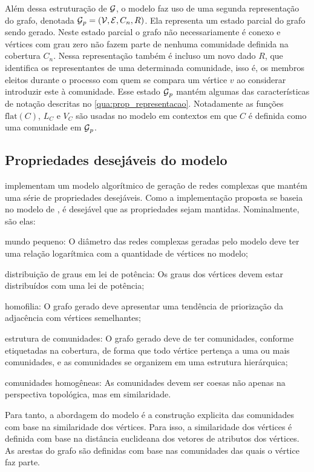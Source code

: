 \documentclass[notes.tex]{subfiles}
\begin{document}
Além dessa estruturação de $\operatorname{\mathcal{G}}$, o modelo faz uso de uma segunda representação do grafo, denotada  $\operatorname{\mathcal{G}}_p = (\operatorname{\mathcal{V}}, \operatorname{\mathcal{E}}, C_n, R)$.
Ela representa um estado parcial do grafo sendo gerado.
Neste estado parcial o grafo não necessariamente é conexo e vértices com grau zero não fazem parte de nenhuma comunidade definida na cobertura $C_n$.
Nessa representação também é incluso um novo dado $R$, que identifica os representantes de uma determinada comunidade, isso é, os membros eleitos durante o processo com quem se compara um vértice $v$ ao considerar introduzir este à comunidade.
Esse estado $\operatorname{\mathcal{G}}_p$ mantém algumas das características de notação descritas no \autoref{qua:prop_representacao}.
Notadamente as funções $\text{flat}(C)$, $L_C$ e $V_C$ são usadas no modelo em contextos em que  $C$ é definida como uma comunidade em $\operatorname{\mathcal{G}}_p$.

\subsection{Propriedades desejáveis do modelo}

 implementam um modelo algorítmico de geração de redes complexas que mantém uma série de propriedades desejáveis.
Como a implementação proposta se baseia no modelo de , é desejável que as propriedades sejam mantidas.
Nominalmente, são elas:

\begin{alineas}
    \item mundo pequeno: O diâmetro das redes complexas geradas pelo modelo deve ter uma relação logarítmica com a quantidade de vértices no modelo;
    \item distribuição de graus em lei de potência: Os graus dos vértices devem estar distribuídos com uma lei de potência;
    \item homofilia: O grafo gerado deve apresentar uma tendência de priorização da adjacência com vértices semelhantes;
    \item estrutura de comunidades: O grafo gerado deve de ter comunidades, conforme etiquetadas na cobertura, de forma que todo vértice pertença a uma ou mais comunidades, e as comunidades se organizem em uma estrutura hierárquica;
    \item comunidades homogêneas: As comunidades devem ser coesas não apenas na perspectiva topológica, mas em similaridade.
\end{alineas}

Para tanto, a abordagem do modelo é a construção explicita das comunidades com base na similaridade dos vértices.
Para isso, a similaridade dos vértices é definida com base na distância euclideana dos vetores de atributos dos vértices.
As arestas do grafo são definidas com base nas comunidades das quais o vértice faz parte.
\end{document}
